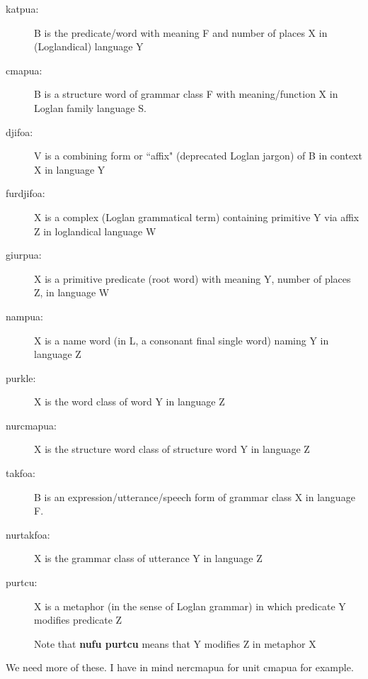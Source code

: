 \documentclass[12pt]{article}
\begin{document}
\begin{description}

\item[katpua:]   B is the predicate/word with meaning F and number of places X in (Loglandical) language Y

\item[cmapua:]  B is a structure word of grammar class F with meaning/function X in Loglan family language S.

\item[djifoa:]  V is a combining form or ``affix" (deprecated Loglan jargon) of B in context X in language Y

\item[furdjifoa:]  X is a complex (Loglan grammatical term) containing primitive Y via affix Z in
  loglandical language W

\item[giurpua:]  X is a primitive predicate (root word) with meaning Y, number of places Z, in language W

\item[nampua:]  X is a name word (in L, a consonant final single word) naming Y in language Z

\item[purkle:]  X is the word class of word Y in language Z

\item[nurcmapua:]  X is the structure word class of structure word Y in language Z

\item[takfoa:]  B is an expression/utterance/speech form of grammar class X in language F.

\item[nurtakfoa:]  X is the grammar class of utterance Y in language Z

\item[purtcu:]  X is a metaphor (in the sense of Loglan grammar) in which predicate Y modifies predicate Z

Note that {\bf nufu purtcu} means that Y modifies Z in metaphor X

\end{description}

We need more of these.  I have in mind nercmapua for unit cmapua for example.
\end{document}
